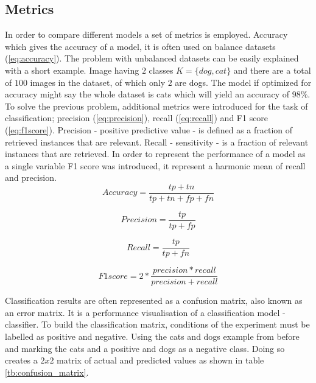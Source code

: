 \documentclass[times, utf8, diplomski]{fer}
\begin{document}
\subsection{Metrics}
In order to compare different models a set of metrics is employed. Accuracy which gives the accuracy of a model, it is often used on balance datasets (\ref{eq:accuracy}). The problem with unbalanced datasets can be easily explained with a short example. Image having $2$ classes $K=\{dog,cat\}$ and there are a total of $100$ images in the dataset, of which only $2$ are dogs. The model if optimized for accuracy might say the whole dataset is cats which will yield an accuracy of $98\%$. To solve the previous problem, additional metrics were introduced for the task of classification; precision (\ref{eq:precision}), recall (\ref{eq:recall}) and F1 score (\ref{eq:f1score}). Precision - positive predictive value - is defined as a fraction of retrieved instances that are relevant. Recall - sensitivity - is a fraction of relevant instances that are retrieved. In order to represent the performance of a model as a single variable F1 score was introduced, it represent a harmonic mean of recall and precision.
\begin{equation} \label{eq:accuracy}
	Accuracy = \frac{tp + tn}{tp + tn + fp + fn}
\end{equation}

\begin{equation} \label{eq:precision}
	Precision = \frac{tp}{tp + fp}
\end{equation}

\begin{equation} \label{eq:recall}
	Recall = \frac{tp}{tp + fn}
\end{equation}

\begin{equation} \label{eq:f1score}
	F1 score = 2 * \frac{precision * recall}{precision + recall}
\end{equation}



Classification results are often represented as a confusion matrix, also known as an error matrix.  It is a performance visualisation of a classification model - classifier. To build the classification matrix, conditions of the experiment must be labelled as positive and negative. Using the cats and dogs example from before and marking the cats and a positive and dogs as a negative class. Doing so creates a $2x2$ matrix of actual and predicted values as shown in table \ref{tb:confusion_matrix}.
\end{document}
